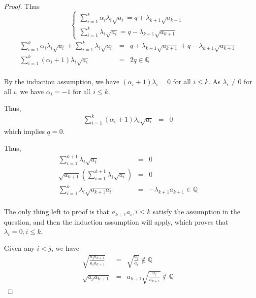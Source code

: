 \documentclass{article}
\begin{document}
\begin{proof}
        Thus
        \begin{equation*}
            \begin{cases}
                \sum_{i=1}^{k} \alpha_{i} \lambda_{i}\sqrt{a_{i}} = q + \lambda_{k+1}\sqrt{a_{k+1}} \\
                \sum_{i=1}^{k} \lambda_{i}\sqrt{a_{i}} = q - \lambda_{k+1}\sqrt{a_{k+1}}
            \end{cases}
        \end{equation*}
        \begin{eqnarray*}
            \sum_{i=1}^{k} \alpha_{i} \lambda_{i}\sqrt{a_{i}} + \sum_{i=1}^{k} \lambda_{i}\sqrt{a_{i}}
            &=& q + \lambda_{k+1}\sqrt{a_{k+1} }+ q - \lambda_{k+1}\sqrt{a_{k+1}} \\
            \sum_{i=1}^{k} ( \alpha_{i} + 1 ) \lambda_{i}\sqrt{a_{i}} &=& 2q \in \mathbb{Q} \\
        \end{eqnarray*}

        By the induction assumption,
        we have $ (\alpha_{i} + 1)\lambda_{i} = 0 $ for all $ i \le k $.
        As $ \lambda_{i} \neq 0 $ for all $ i $,
        we have $ \alpha_{i} = -1 $ for all $ i \le k $.

        Thus,
        \begin{eqnarray*}
            \sum_{i=1}^{k} ( \alpha_{i} + 1 ) \lambda_{i}\sqrt{a_{i} } &=& 0
        \end{eqnarray*}
        which implies $ q = 0 $.

        Thus,
        \begin{eqnarray*}
            \sum_{i=1}^{k+1} \lambda_{i}\sqrt{a_{i}} &=& 0 \\
            \sqrt{a_{k+1}} (\sum_{i=1}^{k+1} \lambda_{i}\sqrt{a_{i}}) &=& 0 \\
            \sum_{i=1}^{k} \lambda_{i}\sqrt{a_{k+1}a_{i}} &=& - \lambda_{k+1} a_{k+1} \in \mathbb{Q}\\
        \end{eqnarray*}

        The only thing left to proof is that
        $ a_{k+1}a_{i}, i \le k $ satisfy the assumption in the question,
        and then the induction assumption will apply,
        which proves that $ \lambda_{i} = 0, i \le k $.

        Given any $ i < j $, we have
        \begin{eqnarray*}
            \sqrt{\frac{a_{j}a_{k+1}}{a_{i}a_{k+1}}} &=& \sqrt{\frac{a_{j}}{a_{i}}} \notin \mathbb{Q} \\
            \sqrt{a_{j}a_{k+1}} &=& a_{k+1} \sqrt{\frac{a_{j}}{a_{k+1}}} \notin \mathbb{Q}
        \end{eqnarray*}
    \end{proof}
\end{document}
